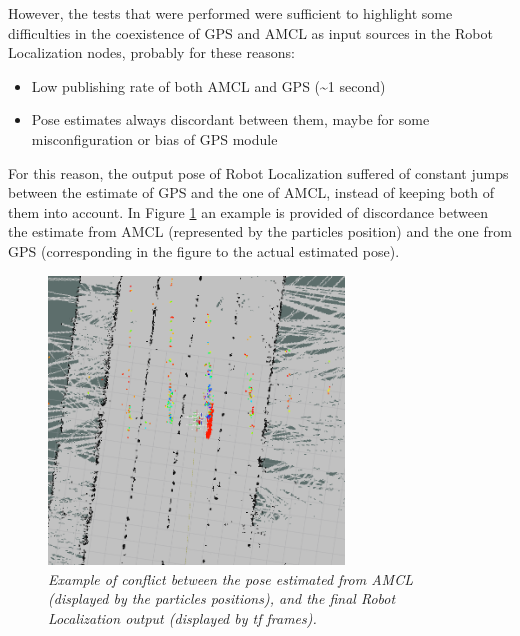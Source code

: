 However, the tests that were performed were sufficient to highlight some difficulties in the coexistence of GPS and \ac{AMCL} as input sources in the Robot Localization nodes, probably for these reasons:
\begin{itemize}
	\item Low publishing rate of both \ac{AMCL} and GPS (\textasciitilde 1 second)
	\item Pose estimates always discordant between them, maybe for some misconfiguration or bias of GPS module
\end{itemize}
For this reason, the output pose of Robot Localization suffered of constant jumps between the estimate of GPS and the one of \ac{AMCL}, instead of keeping both of them into account. In Figure \ref{fig:amclRobotLocalization} an example is provided of discordance between the estimate from \ac{AMCL} (represented by the particles position) and the one from GPS (corresponding in the figure to the actual estimated pose).


\begin{figure}
	\centering
	\includegraphics[width=0.7\textwidth]{Images/localization/amcl_robot_localization.png}
	\caption{\textit{Example of conflict between the pose estimated from \ac{AMCL} (displayed by the particles positions), and the final Robot Localization output (displayed by tf frames).}}
	\label{fig:amclRobotLocalization}
\end{figure}





